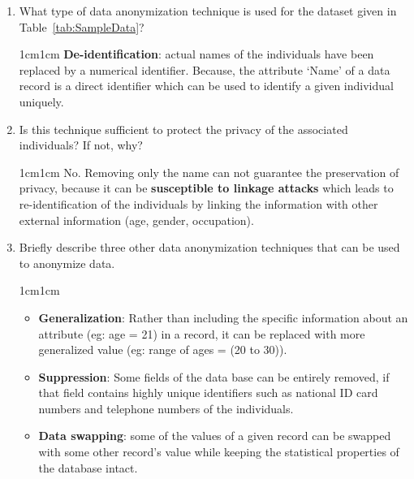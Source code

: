 \documentclass[11pt,letterpaper]{article}
\newenvironment{answer}{\em \color{blue} \begin{adjustwidth}{1cm}{1cm}}{\end{adjustwidth}}
\begin{document}
	\begin{enumerate}
		
		\item What type of data anonymization technique is used for the dataset given in Table~\ref{tab:SampleData}? 
		
		\begin{answer}
			\textbf{De-identification}: actual names of the individuals have been replaced by a numerical identifier. Because, the attribute `Name' of a data record is a direct identifier which can be used to identify a given individual uniquely.
		\end{answer}
		
		\item Is this technique sufficient to protect the privacy of the associated individuals? If not, why?
		
		\begin{answer}
			No. Removing only the name can not guarantee the preservation of privacy, because it can be \textbf{susceptible to linkage attacks} which leads to re-identification of the individuals by linking the information with other external information (age, gender, occupation).
		\end{answer}
		
		
		
		\item Briefly describe three other data anonymization techniques that can be used to anonymize data.
		
		\begin{answer}
			\begin{itemize}
				\item \textbf{Generalization}: Rather than including the specific information about an attribute (eg: age = 21) in a record, it can be replaced with more generalized value (eg: range of ages = (20 to 30)).
				
				\item \textbf{Suppression}: Some fields of the data base can be entirely removed, if that field contains highly unique identifiers such as national ID card numbers and telephone numbers of the individuals.
				
				\item \textbf{Data swapping}: some of the values of a given record can be swapped with some other record's value while keeping the statistical properties of the database intact.
			\end{itemize}
		\end{answer}
		

\end{enumerate}
\end{document}
